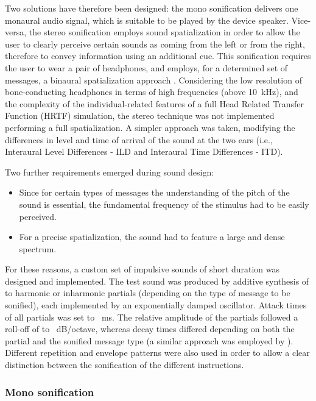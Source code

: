 \documentclass{article}
\begin{document}
Two solutions have therefore been designed: the mono sonification delivers one monaural audio signal, which is suitable to be played by the device speaker. Vice-versa, the stereo sonification employs sound spatialization in order to allow the user to clearly perceive certain sounds as coming from the left or from the right, therefore to convey information using an additional cue. This sonification requires the user to wear a pair of headphones, and employs, for a determined set of messages, a binaural spatialization approach \cite{HammershoiMoller2002}.
Considering the low resolution of bone-conducting headphones in terms of high frequencies (above 10~kHz), and the complexity of the individual-related features of a full Head Related Transfer Function (HRTF) simulation, the stereo technique was not implemented performing a full spatialization. A simpler approach was taken, modifying the differences in level and time of arrival of the sound at the two ears (i.e., Interaural Level Differences - ILD and Interaural Time Differences - ITD).

Two further requirements emerged during sound design:
\begin{itemize}
\item Since for certain types of messages the understanding of the pitch of the sound is essential, the fundamental frequency of the stimulus had to be easily perceived.
\item For a precise spatialization, the sound had to feature a large and dense spectrum.
\end{itemize}

For these reasons, a custom set of impulsive sounds of short duration was designed and implemented.
The test sound was produced by additive synthesis of  to  harmonic or inharmonic partials (depending on the type of message to be sonified), each implemented by an exponentially damped oscillator. Attack times of all partials was set to ~ms. The relative amplitude of the partials followed a roll-off of  to ~dB/octave, whereas decay times differed depending on both the partial and the sonified message type (a similar approach was employed by \cite{KatzRio2008}).
Different repetition and envelope patterns were also used in order to allow a clear distinction between the sonification of the different instructions.

\subsubsection{Mono sonification}
\label{sub:mono}
\end{document}
